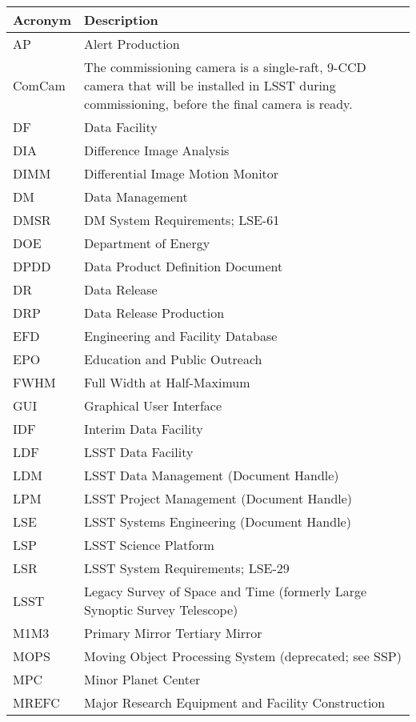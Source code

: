 \addtocounter{table}{-1}
\begin{longtable}{p{}p{}}\hline
\textbf{Acronym} & \textbf{Description}  \\\hline

AP & Alert Production \\\hline
ComCam & The commissioning camera is a single-raft, 9-CCD camera that will be installed in LSST during commissioning, before the final camera is ready. \\\hline
DF & Data Facility \\\hline
DIA & Difference Image Analysis \\\hline
DIMM & Differential Image Motion Monitor \\\hline
DM & Data Management \\\hline
DMSR & DM System Requirements; LSE-61 \\\hline
DOE & Department of Energy \\\hline
DPDD & Data Product Definition Document \\\hline
DR & Data Release \\\hline
DRP & Data Release Production \\\hline
EFD & Engineering and Facility Database \\\hline
EPO & Education and Public Outreach \\\hline
FWHM & Full Width at Half-Maximum \\\hline
GUI & Graphical User Interface \\\hline
IDF & Interim Data Facility \\\hline
LDF & LSST Data Facility \\\hline
LDM & LSST Data Management (Document Handle) \\\hline
LPM & LSST Project Management (Document Handle) \\\hline
LSE & LSST Systems Engineering (Document Handle) \\\hline
LSP & LSST Science Platform \\\hline
LSR & LSST System Requirements; LSE-29 \\\hline
LSST & Legacy Survey of Space and Time (formerly Large Synoptic Survey Telescope) \\\hline
M1M3 & Primary Mirror Tertiary Mirror \\\hline
MOPS & Moving Object Processing System (deprecated; see SSP) \\\hline
MPC & Minor Planet Center \\\hline
MREFC & Major Research Equipment and Facility Construction \\\hline

\end{longtable}
